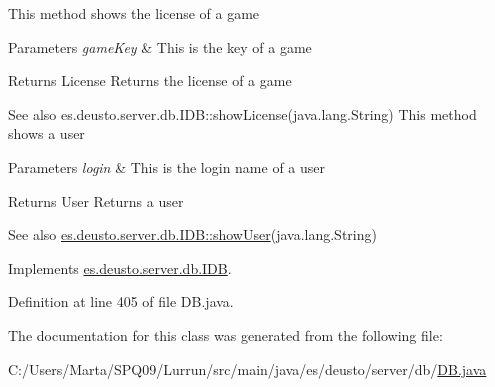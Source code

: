 This method shows the license of a game 
\begin{DoxyParams}{Parameters}
{\em game\+Key} & This is the key of a game \\
\hline
\end{DoxyParams}
\begin{DoxyReturn}{Returns}
License Returns the license of a game 
\end{DoxyReturn}
\begin{DoxySeeAlso}{See also}
es.\+deusto.\+server.\+db.\+I\+D\+B\+::show\+License(java.\+lang.\+String) This method shows a user 
\end{DoxySeeAlso}

\begin{DoxyParams}{Parameters}
{\em login} & This is the login name of a user \\
\hline
\end{DoxyParams}
\begin{DoxyReturn}{Returns}
User Returns a user 
\end{DoxyReturn}
\begin{DoxySeeAlso}{See also}
\hyperlink{interfacees_1_1deusto_1_1server_1_1db_1_1_i_d_b_aa2f6a5291fa8aa78d5a73b5878d17986}{es.\+deusto.\+server.\+db.\+I\+D\+B\+::show\+User}(java.\+lang.\+String) 
\end{DoxySeeAlso}


Implements \hyperlink{interfacees_1_1deusto_1_1server_1_1db_1_1_i_d_b_aa2f6a5291fa8aa78d5a73b5878d17986}{es.\+deusto.\+server.\+db.\+I\+DB}.



Definition at line 405 of file D\+B.\+java.



The documentation for this class was generated from the following file\+:\begin{DoxyCompactItemize}
\item 
C\+:/\+Users/\+Marta/\+S\+P\+Q09/\+Lurrun/src/main/java/es/deusto/server/db/\hyperlink{_d_b_8java}{D\+B.\+java}\end{DoxyCompactItemize}
